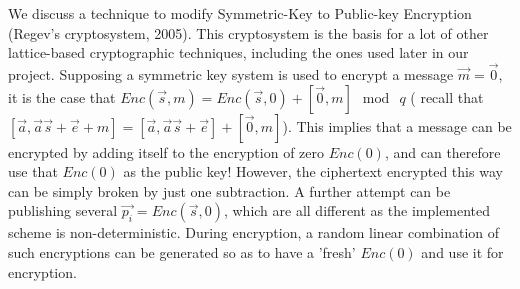 We discuss a technique to modify Symmetric-Key to Public-key
Encryption (Regev's cryptosystem, 2005). This cryptosystem is the basis for a
lot of other lattice-based cryptographic techniques, including the ones used
later in our project. Supposing a symmetric key system is used to
encrypt a message $\vec{m} = \vec{0}$, it is the case that
$Enc(\vec{s}, m) = Enc(\vec{s},0) + [\vec{0}, m] \mod \ q$ ( recall that
$[\vec{a}, \vec{a}\vec{s} + \vec{e} + m] = [\vec{a}, \vec{a}\vec{s} + \vec{e}] +
[\vec{0}, m]$). This implies that a message can be encrypted by adding itself to
the encryption of zero $Enc(0)$, and can therefore use that $Enc(0)$ as the
public key! However, the ciphertext encrypted this way can be simply broken by
just one subtraction. A further attempt can be publishing several
$\vec{p_i} = Enc(\vec{s}, 0)$, which are all different as the implemented scheme is
non-deterministic. During encryption, a random linear
combination of such encryptions can be generated so as to have a 'fresh' $Enc(0)$ and use it for
encryption.

